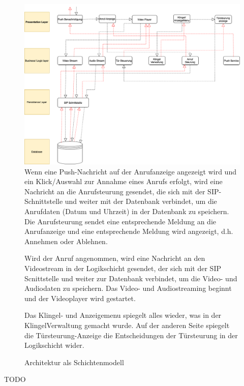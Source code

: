 \begin{figure}[ht!]
    \centering\includegraphics[width=\paperwidth/2]{../assets/img/layered-architecture-pattern.drawio}
Wenn eine Push-Nachricht auf der Anrufanzeige angezeigt wird und ein Klick/Auswahl zur Annahme eines Anrufs erfolgt, wird eine Nachricht an die Anrufsteurung gesendet, die sich mit der SIP-Schnittstelle und weiter mit der Datenbank verbindet, um die Anrufdaten (Datum und Uhrzeit) in der Datenbank zu speichern. Die Anrufsteurung sendet eine entsprechende Meldung an die Anrufanzeige und eine entsprechende Meldung wird angezeigt, d.h. Annehmen oder Ablehnen.

Wird der Anruf angenommen, wird eine Nachricht an den Videostream in der Logikschicht gesendet, der sich mit der SIP Scnittstelle und weiter zur Datenbank verbindet, um die Video- und Audiodaten zu speichern. Das Video- und Audiostreaming beginnt und der Videoplayer wird gestartet. 

Das Klingel- und Anzeigemenu spiegelt alles wieder, was in der KlingelVerwaltung gemacht wurde. Auf der anderen Seite spiegelt die Türsteurung-Anzeige die Entscheidungen der Türsteurung in der Logikschicht wider. 
    \caption{Architektur als Schichtenmodell}
    \label{fig:schichtenmodell}
\end{figure}
TODO
